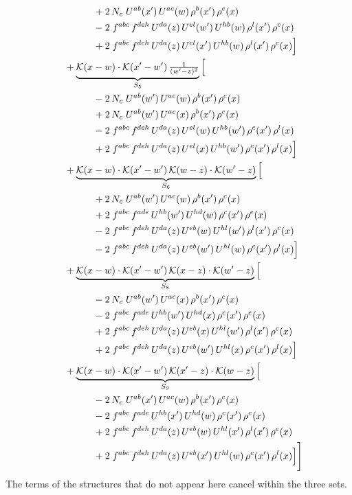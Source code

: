 \documentclass[10pt]{article}
\numberwithin{equation}{section}
\begin{document}
\begin{align}
&\qquad\qquad +2\,N_c\;U^{ab}(x')\,U^{ac}(w)\,\rho^{b}(x')\,\rho^{c}(x)\notag\\
&\qquad\qquad -2\;f^{abc}\,f^{deh}\,U^{da}(z)\,U^{el}(w')\,U^{hb}(w)\,\rho^{l}(x')\,\rho^{c}(x)\notag\\
&\qquad\qquad +2\;f^{abc}\,f^{deh}\,U^{da}(z)\,U^{el}(x')\,U^{hb}(w)\,\rho^{l}(x')\,\rho^{c}(x)\Big]\notag\\
&\quad +\underbrace{\mathcal{K}(x-w)\cdot\mathcal{K}(x'-w')\,\tfrac{1}{(w'-z)^{2}}}_{S_{5}}\Big[\notag\\
&\qquad\qquad -2\,N_c\;U^{ab}(w')\,U^{ac}(w)\,\rho^{b}(x')\,\rho^{c}(x)\notag\\
&\qquad\qquad +2\,N_c\;U^{ab}(w')\,U^{ac}(x)\,\rho^{b}(x')\,\rho^{c}(x)\notag\\
&\qquad\qquad -2\;f^{abc}\,f^{deh}\,U^{da}(z)\,U^{el}(w)\,U^{hb}(w')\,\rho^{c}(x')\,\rho^{l}(x)\notag\\
&\qquad\qquad +2\;f^{abc}\,f^{deh}\,U^{da}(z)\,U^{el}(x)\,U^{hb}(w')\,\rho^{c}(x')\,\rho^{l}(x)\Big]\notag\\
&\quad +\underbrace{\mathcal{K}(x-w)\cdot\mathcal{K}(x'-w')\,\mathcal{K}(w-z)\cdot\mathcal{K}(w'-z)}_{S_{6}}\Big[\notag\\
&\qquad\qquad +2\,N_c\;U^{ab}(w')\,U^{ac}(w)\,\rho^{b}(x')\,\rho^{c}(x)\notag\\
&\qquad\qquad +2\;f^{abc}\,f^{ade}\,U^{hb}(w')\,U^{hd}(w)\,\rho^{c}(x')\,\rho^{e}(x)\notag\\
&\qquad\qquad -2\;f^{abc}\,f^{deh}\,U^{da}(z)\,U^{eb}(w)\,U^{hl}(w')\,\rho^{l}(x')\,\rho^{c}(x)\notag\\
&\qquad\qquad -2\;f^{abc}\,f^{deh}\,U^{da}(z)\,U^{eb}(w')\,U^{hl}(w)\,\rho^{c}(x')\,\rho^{l}(x)\Big]\notag\\
&\quad +\underbrace{\mathcal{K}(x-w)\cdot\mathcal{K}(x'-w')\,\mathcal{K}(x-z)\cdot\mathcal{K}(w'-z)}_{S_{8}}\Big[\notag\\
&\qquad\qquad -2\,N_c\;U^{ab}(w')\,U^{ac}(x)\,\rho^{b}(x')\,\rho^{c}(x)\notag\\
&\qquad\qquad -2\;f^{abc}\,f^{ade}\,U^{hb}(w')\,U^{hd}(x)\,\rho^{c}(x')\,\rho^{e}(x)\notag\\
&\qquad\qquad +2\;f^{abc}\,f^{deh}\,U^{da}(z)\,U^{eb}(x)\,U^{hl}(w')\,\rho^{l}(x')\,\rho^{c}(x)\notag\\
&\qquad\qquad +2\;f^{abc}\,f^{deh}\,U^{da}(z)\,U^{eb}(w')\,U^{hl}(x)\,\rho^{c}(x')\,\rho^{l}(x)\Big]\notag\\
&\quad +\underbrace{\mathcal{K}(x-w)\cdot\mathcal{K}(x'-w')\,\mathcal{K}(x'-z)\cdot\mathcal{K}(w-z)}_{S_{9}}\Big[\notag\\
&\qquad\qquad -2\,N_c\;U^{ab}(x')\,U^{ac}(w)\,\rho^{b}(x')\,\rho^{c}(x)\notag\\
&\qquad\qquad -2\;f^{abc}\,f^{ade}\,U^{hb}(x')\,U^{hd}(w)\,\rho^{c}(x')\,\rho^{e}(x)\notag\\
&\qquad\qquad +2\;f^{abc}\,f^{deh}\,U^{da}(z)\,U^{eb}(w)\,U^{hl}(x')\,\rho^{l}(x')\,\rho^{c}(x)\notag\\
&\qquad\qquad +2\;f^{abc}\,f^{deh}\,U^{da}(z)\,U^{eb}(x')\,U^{hl}(w)\,\rho^{c}(x')\,\rho^{l}(x)\Big]\Bigg]\label{eq:Jexp}
\end{align}
The terms of the structures that do not appear here cancel within the three sets.
\end{document}
